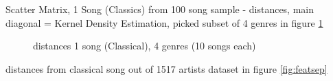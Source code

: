 \noindent Scatter Matrix, 1 Song (Classics) from 100 song sample - distances, main diagonal = Kernel Density Estimation, picked subset of 4 genres in figure \ref{fig:corr7}
\begin{figure}[htbp]
	\centering
	\caption{distances 1 song (Classical), 4 genres (10 songs each)}
	\label{fig:corr7}
\end{figure}
\FloatBarrier

\noindent distances from classical song out of 1517 artists dataset in figure \ref{fig:featsep}\\

